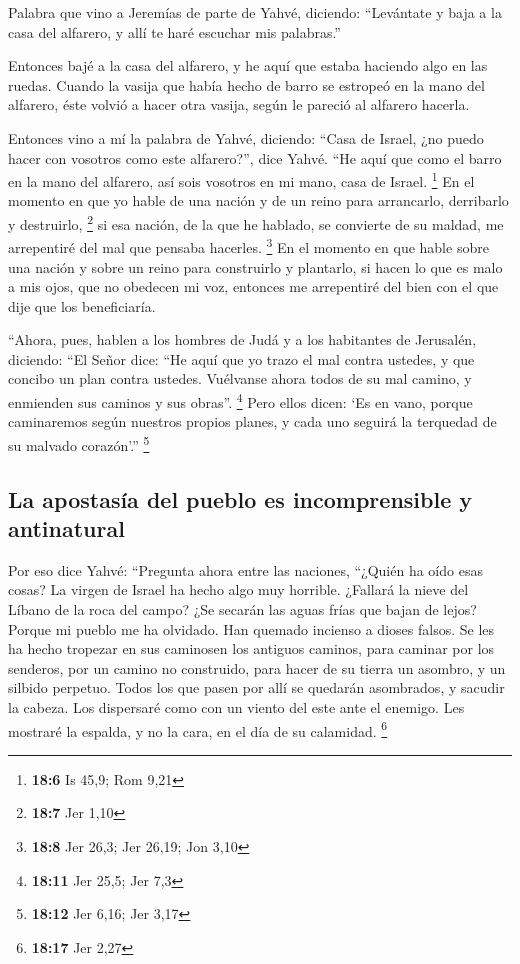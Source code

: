  Palabra que vino a Jeremías de parte de Yahvé, diciendo:
 ``Levántate y baja a la casa del alfarero, y allí te haré
escuchar mis palabras.''

 Entonces bajé a la casa del alfarero, y he aquí que
estaba haciendo algo en las ruedas.  Cuando la vasija que
había hecho de barro se estropeó en la mano del alfarero, éste volvió a
hacer otra vasija, según le pareció al alfarero hacerla.

 Entonces vino a mí la palabra de Yahvé, diciendo:
 ``Casa de Israel, ¿no puedo hacer con vosotros como este
alfarero?'', dice Yahvé. ``He aquí que como el barro en la mano del
alfarero, así sois vosotros en mi mano, casa de Israel. \footnote{\textbf{18:6}
  Is 45,9; Rom 9,21}  En el momento en que yo hable de una
nación y de un reino para arrancarlo, derribarlo y destruirlo,
\footnote{\textbf{18:7} Jer 1,10}  si esa nación, de la
que he hablado, se convierte de su maldad, me arrepentiré del mal que
pensaba hacerles. \footnote{\textbf{18:8} Jer 26,3; Jer 26,19; Jon 3,10}
 En el momento en que hable sobre una nación y sobre un
reino para construirlo y plantarlo,  si hacen lo que es
malo a mis ojos, que no obedecen mi voz, entonces me arrepentiré del
bien con el que dije que los beneficiaría.

 ``Ahora, pues, hablen a los hombres de Judá y a los
habitantes de Jerusalén, diciendo: ``El Señor dice: ``He aquí que yo
trazo el mal contra ustedes, y que concibo un plan contra ustedes.
Vuélvanse ahora todos de su mal camino, y enmienden sus caminos y sus
obras''. \footnote{\textbf{18:11} Jer 25,5; Jer 7,3} 
Pero ellos dicen: `Es en vano, porque caminaremos según nuestros propios
planes, y cada uno seguirá la terquedad de su malvado corazón'.''
\footnote{\textbf{18:12} Jer 6,16; Jer 3,17}

\hypertarget{la-apostasuxeda-del-pueblo-es-incomprensible-y-antinatural}{%
\subsection{La apostasía del pueblo es incomprensible y
antinatural}\label{la-apostasuxeda-del-pueblo-es-incomprensible-y-antinatural}}

 Por eso dice Yahvé: ``Pregunta ahora entre las naciones,
``¿Quién ha oído esas cosas? La virgen de Israel ha hecho algo muy
horrible.  ¿Fallará la nieve del Líbano de la roca del
campo? ¿Se secarán las aguas frías que bajan de lejos? 
Porque mi pueblo me ha olvidado. Han quemado incienso a dioses falsos.
Se les ha hecho tropezar en sus caminosen los antiguos caminos, para
caminar por los senderos, por un camino no construido, 
para hacer de su tierra un asombro, y un silbido perpetuo. Todos los que
pasen por allí se quedarán asombrados, y sacudir la cabeza.
 Los dispersaré como con un viento del este ante el
enemigo. Les mostraré la espalda, y no la cara, en el día de su
calamidad. \footnote{\textbf{18:17} Jer 2,27}

